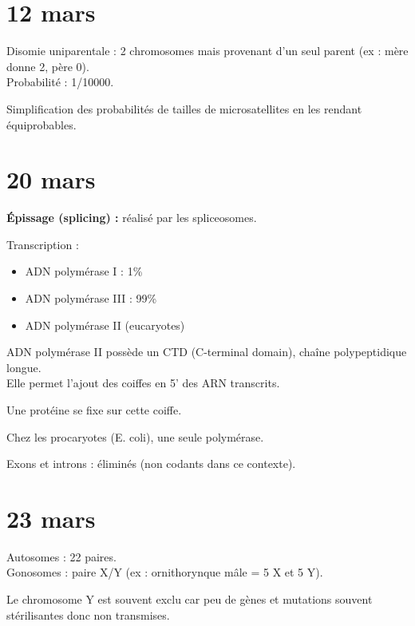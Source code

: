 \documentclass[11pt]{article}
\begin{document}
\section*{12 mars}

Disomie uniparentale : 2 chromosomes mais provenant d'un seul parent (ex : mère donne 2, père 0).\\
Probabilité : 1/10000.

Simplification des probabilités de tailles de microsatellites en les rendant équiprobables.

\section*{20 mars}

\textbf{Épissage (splicing) :} réalisé par les spliceosomes.

\vspace{0.3cm}

Transcription :
\begin{itemize}
    \item ADN polymérase I : 1\%
    \item ADN polymérase III : 99\%
    \item ADN polymérase II (eucaryotes)
\end{itemize}

ADN polymérase II possède un CTD (C-terminal domain), chaîne polypeptidique longue.\\
Elle permet l'ajout des coiffes en 5' des ARN transcrits.

Une protéine se fixe sur cette coiffe.

Chez les procaryotes (E. coli), une seule polymérase.

\vspace{0.3cm}

Exons et introns : éliminés (non codants dans ce contexte).

\section*{23 mars}

Autosomes : 22 paires.\\
Gonosomes : paire X/Y (ex : ornithorynque mâle = 5 X et 5 Y).

Le chromosome Y est souvent exclu car peu de gènes et mutations souvent stérilisantes donc non transmises.

\vspace{0.3cm}
\end{document}
